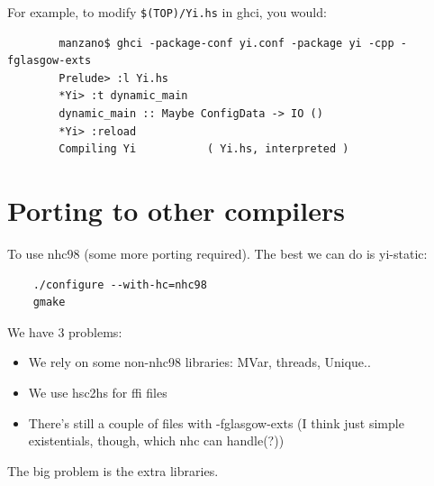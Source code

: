 \documentclass[]{article}
\newcommand{\code}[1]{\texttt{#1}}
\begin{document}
For example, to modify \code{\$(TOP)/Yi.hs} in ghci, you would:

{\small
\begin{verbatim}
        manzano$ ghci -package-conf yi.conf -package yi -cpp -fglasgow-exts
        Prelude> :l Yi.hs
        *Yi> :t dynamic_main
        dynamic_main :: Maybe ConfigData -> IO ()
        *Yi> :reload
        Compiling Yi           ( Yi.hs, interpreted )
\end{verbatim}
}

\section{Porting to other compilers}

To use nhc98 (some more porting required). The best we can do is
yi-static:
\begin{verbatim}
    ./configure --with-hc=nhc98
    gmake
\end{verbatim}

We have 3 problems:
\begin{itemize}
    \item We rely on some non-nhc98 libraries: MVar, threads, Unique..
    \item We use hsc2hs for ffi files
    \item There's still a couple of files with -fglasgow-exts (I think just
      simple existentials, though, which nhc can handle(?))
\end{itemize}

The big problem is the extra libraries.



\end{document}

